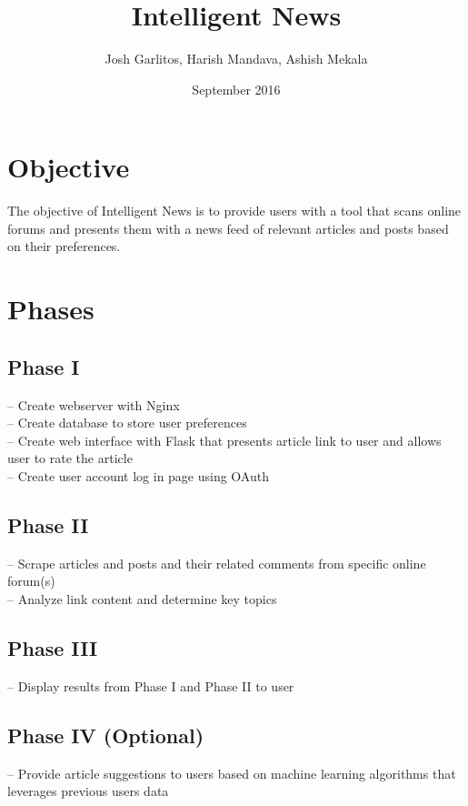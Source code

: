 \documentclass{article}
\title{Intelligent News}
\author{Josh Garlitos, Harish Mandava, Ashish Mekala}
\date{September 2016}
\begin{document}
\maketitle

\section{Objective}
The objective of Intelligent News is to provide users with a tool that scans online forums and presents them with a news feed of relevant articles and posts based on their preferences.

\section{Phases}

\subsection{Phase I}
-- Create webserver with Nginx
\\-- Create database to store user preferences
\\-- Create web interface with Flask that presents article link to user and allows user to rate the article
\\-- Create user account log in page using OAuth


\subsection{Phase II}
-- Scrape articles and posts and their related comments from specific online forum(s)
\\-- Analyze link content and determine key topics

\subsection{Phase III}
-- Display results from Phase I and Phase II to user

\subsection{Phase IV (Optional)}
-- Provide article suggestions to users based on machine learning algorithms that leverages previous users data
\end{document}
